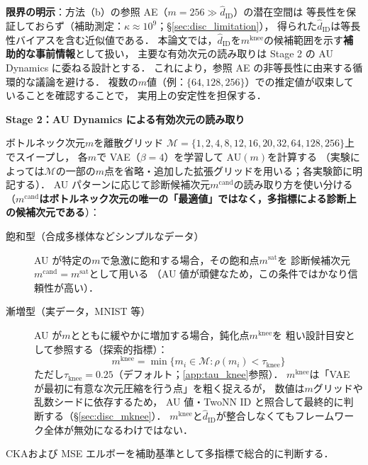 \documentclass[11pt,a4paper]{jsarticle}
\newcommand{\dzopt}{m^{\mathrm{cand}}}
\newcommand{\kap}{\kappa}
\newcommand{\dzsat}{m^{\mathrm{sat}}}
\newcommand{\mknee}{m^{\mathrm{knee}}}
\begin{document}
\textbf{限界の明示}：方法（b）の参照 AE（$m = 256 \gg \hat{d}_\mathrm{ID}$）の潜在空間は
等長性を保証しておらず（補助測定：$\kap \approx 10^9$；§\ref{sec:disc_limitation}），
得られた$\hat{d}_\mathrm{ID}$は等長性バイアスを含む近似値である．
本論文では，$\hat{d}_\mathrm{ID}$を$\mknee$の候補範囲を示す\textbf{補助的な事前情報}として扱い，
主要な有効次元の読み取りは Stage 2 の AU Dynamics に委ねる設計とする．
これにより，参照 AE の非等長性に由来する循環的な議論を避ける．
複数の$m$値（例：$\{64, 128, 256\}$）での推定値が収束していることを確認することで，
実用上の安定性を担保する．

\textbf{Stage 2：AU Dynamics による有効次元の読み取り}

ボトルネック次元$m$を離散グリッド
$\mathcal{M} = \{1, 2, 4, 8, 12, 16, 20, 32, 64, 128, 256\}$上でスイープし，
各$m$で VAE（$\beta = 4$）を学習して AU$(m)$を計算する
（実験によっては$\mathcal{M}$の一部の$m$点を省略・追加した拡張グリッドを用いる；各実験節に明記する）．
AU パターンに応じて診断候補次元$\dzopt$の読み取り方を使い分ける
（\textbf{$\dzopt$はボトルネック次元の唯一の「最適値」ではなく，多指標による診断上の候補次元である}）：

\begin{description}
  \item[飽和型（合成多様体などシンプルなデータ）]
        AU が特定の$m$で急激に飽和する場合，その飽和点$\dzsat$を
        診断候補次元$\dzopt = \dzsat$として用いる
        （AU 値が頑健なため，この条件ではかなり信頼性が高い）．
  \item[漸増型（実データ，MNIST 等）]
        AU が$m$とともに緩やかに増加する場合，鈍化点$\mknee$を
        粗い設計目安として参照する（探索的指標）：
        \begin{equation}
          \mknee = \min\{m_i \in \mathcal{M} : \rho(m_i) < \tau_{\mathrm{knee}}\}
          \label{eq:mknee}
        \end{equation}
        ただし$\tau_{\mathrm{knee}} = 0.25$（デフォルト；\ref{app:tau_knee}参照）．
        $\mknee$は「VAE が最初に有意な次元圧縮を行う点」を粗く捉えるが，
        数値は$m$グリッドや乱数シードに依存するため，
        AU 値・TwoNN ID と照合して最終的に判断する（§\ref{sec:disc_mknee}）．
        $\mknee$と$\hat{d}_\mathrm{ID}$が整合しなくてもフレームワーク全体が無効になるわけではない．
\end{description}

CKA\cite{kornblith2019cka}および MSE エルボーを補助基準として多指標で総合的に判断する．
\end{document}
